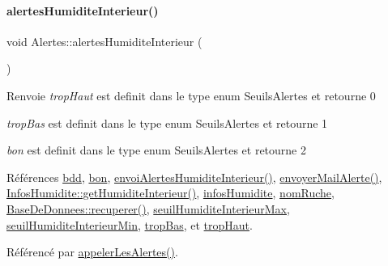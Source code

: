 \mbox{\label{class_alertes_a7558cb097dc392547ceb12ab4d6cbd4c}} 
\paragraph{\texorpdfstring{alertes\+Humidite\+Interieur()}{alertesHumiditeInterieur()}}
{\footnotesize\ttfamily void Alertes\+::alertes\+Humidite\+Interieur (\begin{DoxyParamCaption}{ }\end{DoxyParamCaption})}

\begin{DoxyReturn}{Renvoie}
{\itshape trop\+Haut} est definit dans le type enum Seuils\+Alertes et retourne 0 

{\itshape trop\+Bas} est definit dans le type enum Seuils\+Alertes et retourne 1 

{\itshape bon} est definit dans le type enum Seuils\+Alertes et retourne 2 
\end{DoxyReturn}


Références \hyperlink{class_alertes_a91e58b69d29922e8e984efb767ae5268}{bdd}, \hyperlink{parametres_8h_aaa6de8207c94675264c90b10b613368da5ac8ec3b54d90a07c6bb5a77ef971821}{bon}, \hyperlink{class_alertes_a6d96d5a6e5a1e3c518c45e295a5b4ddf}{envoi\+Alertes\+Humidite\+Interieur()}, \hyperlink{class_alertes_a375783502a78109f3323dc1ed90cfdc9}{envoyer\+Mail\+Alerte()}, \hyperlink{class_infos_humidite_a652f7ca3e4b97352034fed62c6d865b7}{Infos\+Humidite\+::get\+Humidite\+Interieur()}, \hyperlink{class_alertes_a7b6d798ca0629b474120cd55eb8b510c}{infos\+Humidite}, \hyperlink{class_alertes_a212f2a7185bcc7b11f3e54200272bdcf}{nom\+Ruche}, \hyperlink{class_base_de_donnees_a77539baad389f5acf754cd2cd452403e}{Base\+De\+Donnees\+::recuperer()}, \hyperlink{class_alertes_a795cd3721854335f6c91e6009b324c37}{seuil\+Humidite\+Interieur\+Max}, \hyperlink{class_alertes_a501773587c8f2ccd032fe7db9af1f4e2}{seuil\+Humidite\+Interieur\+Min}, \hyperlink{parametres_8h_aaa6de8207c94675264c90b10b613368da4257e2f8921856770c8266f55c937295}{trop\+Bas}, et \hyperlink{parametres_8h_aaa6de8207c94675264c90b10b613368dabc650d9700ae19f2696e6a6e3f9ab067}{trop\+Haut}.



Référencé par \hyperlink{class_alertes_ad04a02dcc6e6f14da0784c7054888b05}{appeler\+Les\+Alertes()}.


